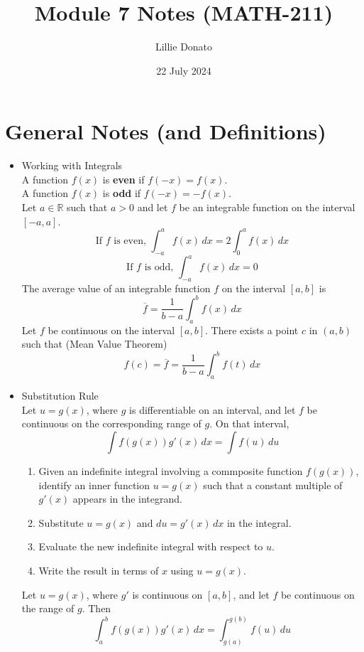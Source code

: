 \documentclass{article}
\title{Module 7 Notes (MATH-211)}
\author{Lillie Donato}
\date{22 July 2024}
\begin{document}
\maketitle

\section*{General Notes (and Definitions)}
\begin{itemize}
    \item Working with Integrals \\
        A function $f(x)$ is \textbf{even} if $f(-x) = f(x)$. \\
        A function $f(x)$ is \textbf{odd} if $f(-x) = -f(x)$. \\
        Let $a \in \mathbb{R}$ such that $a > 0$ and let $f$ be an integrable function on the interval $[-a,a]$.
        $$\text{If } f \text{ is even, } \int_{-a}^a{f(x)\,dx} = 2\int_0^a{f(x)\,dx}$$
        $$\text{If } f \text{ is odd, } \int_{-a}^a{f(x)\,dx} = 0$$
        The average value of an integrable function $f$ on the interval $[a,b]$ is
        $$\overline{f} = \frac{1}{b - a}\int_a^b{f(x)\,dx}$$
        Let $f$ be continuous on the interval $[a,b]$. There exists a point $c$ in $(a,b)$ such that (Mean Value Theorem)
        $$f(c) = \overline{f} = \frac{1}{b - a}\int_a^b{f(t)\,dx}$$
    \item Substitution Rule \\
        Let $u = g(x)$, where $g$ is differentiable on an interval, and let $f$ be continuous on the corresponding range of $g$. On that interval,
        $$\int{f(g(x))g'(x)\,dx} = \int{f(u)\,du}$$
        \begin{enumerate}
            \item Given an indefinite integral involving a commposite function $f(g(x))$, identify an inner function $u = g(x)$ such that a constant multiple of $g'(x)$ appears in the integrand.
            \item Substitute $u = g(x)$ and $du = g'(x)\,dx$ in the integral.
            \item Evaluate the new indefinite integral with respect to $u$.
            \item Write the result in terms of $x$ using $u = g(x)$.
        \end{enumerate}
        Let $u = g(x)$, where $g'$ is continuous on $[a,b]$, and let $f$ be continuous on the range of $g$. Then
        $$\int_a^b{f(g(x))g'(x)\,dx} = \int_{g(a)}^{g(b)}{f(u)\,du}$$

\end{itemize}
\end{document}
